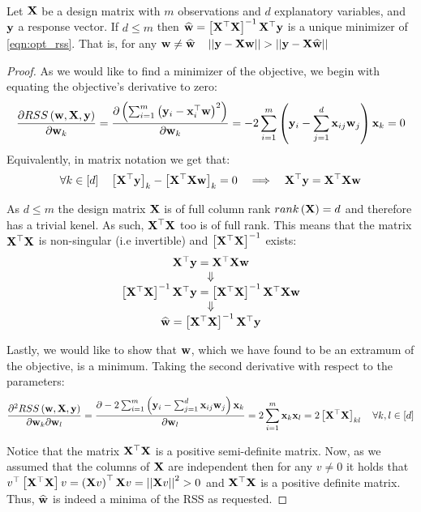 ~\\\begin{theorem}
	Let $\mathbf{X}$ be a design matrix with $m$ observations and $d$ explanatory variables, and $\mathbf{y}$ a response vector. If $d \leq m$ then $\widehat{\mathbf{w}}=\left[\mathbf{X}^\top\mathbf{X}\right]^{-1}\mathbf{X}^\top\mathbf{y}$ is a unique minimizer of \eqref{eqn:opt_rss}. That is, for any $\w\neq\widehat{\w}\quad \norm{\y-\X\w}> \norm{\y-\X\widehat{\w}}$
\end{theorem}
\begin{proof}
As we would like to find a minimizer of the objective, we begin with equating the objective's derivative to zero:
$$
\frac{\partial RSS\left(\mathbf{w},\mathbf{X},\mathbf{y}\right)}{\partial \mathbf{w}_{k}}=\frac{\partial\left(\sum_{i=1}^{m}\left(\mathbf{y}_{i}-\mathbf{x}_{i}^{\top}\mathbf{w}\right)^{2}\right)}{\partial \mathbf{w}_{k}}=-2\sum_{i=1}^{m}\left(\mathbf{y}_{i}-\sum_{j=1}^{d}\mathbf{x}_{ij}\mathbf{w}_{j}\right)\mathbf{x}_{k}=0
$$
Equivalently, in matrix notation we get that:
$$
\forall k\in\left[d\right]\quad\left[\mathbf{X}^{\top}\mathbf{y}\right]_{k}-\left[\mathbf{X}^{\top}\mathbf{X}\mathbf{w}\right]_{k}=0\quad\Longrightarrow\quad \mathbf{X}^{\top}\mathbf{y}=\mathbf{X}^{\top}\mathbf{X}\mathbf{w}
$$
	
As $d\leq m$ the design matrix $\mathbf{X}$ is of full column rank $rank\left(\mathbf{X}\right)=d$ and therefore has a trivial kenel. As such, $\mathbf{X}^\top\mathbf{X}$ too is of full rank. This means that the matrix $\mathbf{X}^\top\mathbf{X}$ is non-singular (i.e invertible) and $\left[\mathbf{X}^\top\mathbf{X}\right]^{-1}$ exists:
$$
\begin{array}{c}
\mathbf{X}^{\top}\mathbf{y}=\mathbf{X}^{\top}\mathbf{X}\mathbf{w}\\
\Downarrow\\
\left[\mathbf{X}^{\top}\mathbf{X}\right]^{-1}\mathbf{X}^{\top}\mathbf{y}=\left[\mathbf{X}^{\top}\mathbf{X}\right]^{-1}\mathbf{X}^{\top}\mathbf{X}\mathbf{w}\\
\Downarrow\\
\widehat{\mathbf{w}}=\left[\mathbf{X}^{\top}\mathbf{X}\right]^{-1}\mathbf{X}^{\top}\mathbf{y}
\end{array}
$$

Lastly, we would like to show that $\mathbf{w}$, which we have found to be an extramum of the objective, is a minimum. Taking the second derivative with respect to the parameters:
$$
\frac{\partial^{2}RSS\left(\mathbf{w},\mathbf{X},\mathbf{y}\right)}{\partial \mathbf{w}_{k}\partial \mathbf{w}_{l}}	=\frac{\partial-2\sum_{i=1}^{m}\left(\mathbf{y}_{i}-\sum_{j=1}^{d}\mathbf{x}_{ij}\mathbf{w}_{j}\right)\mathbf{x}_{k}}{\partial \mathbf{w}_{l}}
=2\sum_{i=1}^{m}\mathbf{x}_{k}\mathbf{x}_{l}
=2\left[\mathbf{X}^{\top}\mathbf{X}\right]_{kl}\quad\forall k,l\in\left[d\right]
$$

Notice that the matrix $\mathbf{X}^\top\mathbf{X}$ is a positive semi-definite matrix. Now, as we assumed that the columns of $\mathbf{X}$ are independent then for any $v\neq 0$ it holds that $v^\top \left[\mathbf{X}^\top \mathbf{X}\right]v=\left(\mathbf{X} v \right)^{\top} \mathbf{X} v = \left|\left| \mathbf{X} v\right|\right|^2>0$ and $\mathbf{X}^\top\mathbf{X}$ is a positive definite matrix. Thus, $\widehat{\mathbf{w}}$  is indeed a minima of the RSS as requested.
\end{proof}

